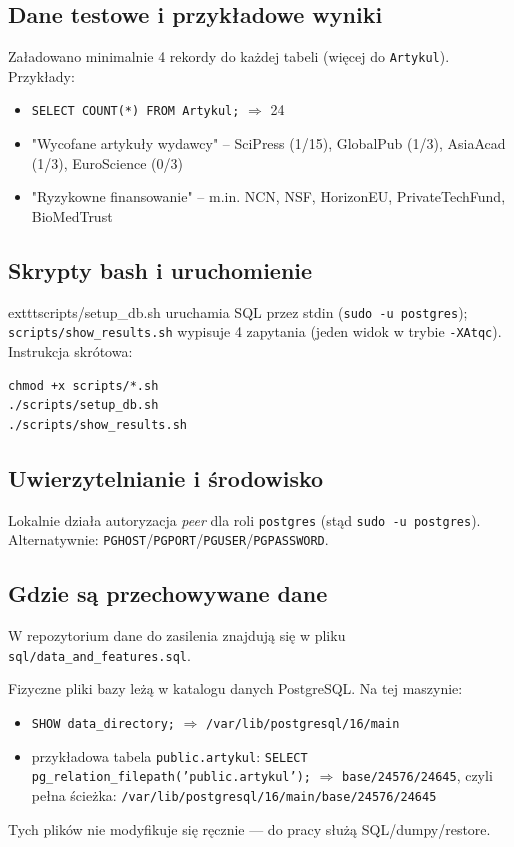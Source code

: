 \documentclass[12pt,a4paper]{article}
\begin{document}
\subsection{Dane testowe i przykładowe wyniki}
Załadowano minimalnie 4 rekordy do każdej tabeli (więcej do \texttt{Artykul}).\newline
Przykłady:
\begin{itemize}
  \item \texttt{SELECT COUNT(*) FROM Artykul;} $\Rightarrow$ 24
  \item "Wycofane artykuły wydawcy" – SciPress (1/15), GlobalPub (1/3), AsiaAcad (1/3), EuroScience (0/3)
  \item "Ryzykowne finansowanie" – m.in. NCN, NSF, HorizonEU, PrivateTechFund, BioMedTrust
\end{itemize}

\subsection{Skrypty bash i uruchomienie}
	exttt{scripts/setup\_db.sh} uruchamia SQL przez stdin (\texttt{sudo -u postgres}); \texttt{scripts/show\_results.sh} wypisuje 4 zapytania (jeden widok w trybie \texttt{-XAtqc}).
Instrukcja skrótowa:
\begin{verbatim}
chmod +x scripts/*.sh
./scripts/setup_db.sh
./scripts/show_results.sh
\end{verbatim}

\subsection{Uwierzytelnianie i środowisko}
Lokalnie działa autoryzacja \emph{peer} dla roli \texttt{postgres} (stąd \texttt{sudo -u postgres}). Alternatywnie: \texttt{PGHOST}/\texttt{PGPORT}/\texttt{PGUSER}/\texttt{PGPASSWORD}.

\subsection{Gdzie są przechowywane dane}
W repozytorium dane do zasilenia znajdują się w pliku \texttt{sql/data\_and\_features.sql}.

Fizyczne pliki bazy leżą w katalogu danych PostgreSQL. Na tej maszynie:

\begin{itemize}
  \item \texttt{SHOW data\_directory;} $\Rightarrow$ \texttt{/var/lib/postgresql/16/main}
  \item przykładowa tabela \texttt{public.artykul}: \texttt{SELECT pg\_relation\_filepath('public.artykul');} $\Rightarrow$ \texttt{base/24576/24645}, czyli pełna ścieżka: \texttt{/var/lib/postgresql/16/main/base/24576/24645}
\end{itemize}
Tych plików nie modyfikuje się ręcznie — do pracy służą SQL/dumpy/restore.

\end{document}
